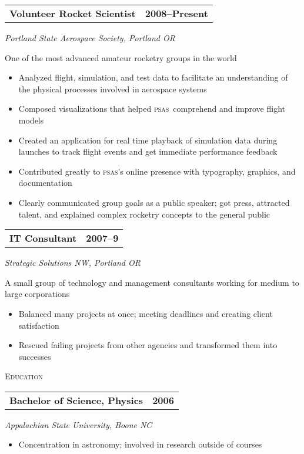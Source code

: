 \documentclass[letterpaper,10pt]{article}
\makeatletter
\newcommand{\PSAS}{\textsc{psas}}
\newcommand{\resumeheader}[1]{
  \vspace{0.08in}
  \textsc{\Large #1}
  \vspace{0.10in}
}
\newcommand{\resumeitem}[4]{
  {\addtolength{\leftskip}{0.21in}
    \begin{tabular*}{6.25in}{l@{\extracolsep{\fill}} r}
      {\textbf{#1}} & {\textbf{#2}} \\
    \end{tabular*}
    
  }
  
  \vspace{0.01in}
  {\addtolength{\leftskip}{0.3in}
    \textit{#3}\par
  }
  
  \vspace{0.07in}
  {\addtolength{\leftskip}{0.3in}
    \small
    \begin{minipage}{5in}
      #4
    \end{minipage}
    
  }
  \vspace{0.15in}
}
\makeatother
\begin{document}
\resumeitem{Volunteer Rocket Scientist}{2008--Present}%
           {Portland State Aerospace Society, Portland OR}%
           {
              One of the most advanced amateur rocketry groups in the world
              \begin{itemize}[topsep=1pt, itemsep=0pt, parsep=0pt]
                \renewcommand{\labelitemi}{---}
                \item Analyzed flight, simulation, and test data to facilitate an understanding of the physical processes involved in aerospace systems
                \item Composed visualizations that helped \PSAS\ comprehend and improve flight models
                \item Created an application for real time playback of simulation data during launches to track flight events and get immediate performance feedback
                \item Contributed greatly to \PSAS's online presence with typography, graphics, and documentation
                \item Clearly communicated group goals as a public speaker; got press, attracted talent, and explained complex rocketry concepts to the general public
              \end{itemize}
           }

\resumeitem{IT Consultant}{2007--9}%
           {Strategic Solutions NW, Portland OR}%
           {
              A small group of technology and management consultants working for
              medium to large corporations
              \begin{itemize}[topsep=1pt, itemsep=0pt, parsep=0pt]
                \renewcommand{\labelitemi}{---}
                \item Balanced many projects at once; meeting deadlines and creating client satisfaction
                \item Rescued failing projects from other agencies and transformed them into successes
              \end{itemize}
           }

\resumeheader{Education}

\resumeitem{Bachelor of Science, Physics} {2006}%
           {Appalachian State University, Boone NC}%
           {
              \begin{itemize}[topsep=1pt, itemsep=0pt, parsep=0pt]
                \renewcommand{\labelitemi}{---}
                \item Concentration in astronomy; involved in research outside of courses
              \end{itemize}
           }
\end{document}
